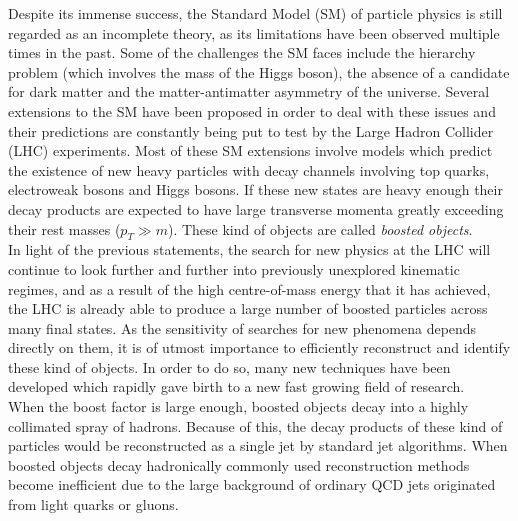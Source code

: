 \documentclass[main]{subfiles} %
\begin{document}


\doublespacing

\vspace{20pt}

Despite its immense success, the Standard Model (SM) of particle physics is still regarded as an incomplete theory, as its limitations have been observed multiple times in the past. Some of the challenges the SM faces include the hierarchy problem (which involves the mass of the Higgs boson), the absence of a candidate for dark matter and the matter-antimatter asymmetry of the universe. Several extensions to the SM have been proposed in order to deal with these issues and their predictions are constantly being put to test by the Large Hadron Collider (LHC) experiments. Most of these SM extensions involve models which predict the existence of new heavy particles with decay channels involving top quarks, electroweak bosons and Higgs bosons. If these new states are heavy enough their decay products are expected to have large transverse momenta greatly exceeding their rest masses ($p_T \gg m$). These kind of objects are called \textit{boosted objects}. \\ 

In light of the previous statements, the search for new physics at the LHC will continue to look further and further into previously unexplored kinematic regimes, and as a result of the high centre-of-mass energy that it has achieved, the LHC is already able to produce a large number of boosted particles across many final states. As the sensitivity of searches for new phenomena depends directly on them, it is of utmost importance to efficiently reconstruct and identify these kind of objects. In order to do so, many new techniques have been developed which rapidly gave birth to a new fast growing field of research. \\

When the boost factor is large enough, boosted objects decay into a highly collimated spray of hadrons. Because of this, the decay products of these kind of particles would be reconstructed as a single jet by standard jet algorithms. When boosted objects decay hadronically commonly used reconstruction methods become inefficient due to the large background of ordinary QCD jets originated from light quarks or gluons. \\ 
\end{document}
